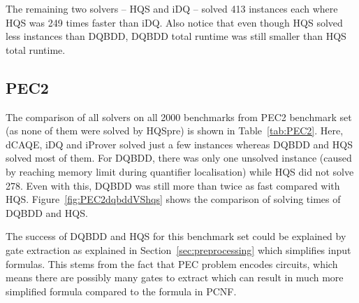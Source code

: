 \documentclass[
  digital, %
  color,
  twoside, %
  table,   %
  nolof,     %
  nolot,     %
]{fithesis3}
\theoremstyle{definition}
\theoremstyle{remark}
\begin{document}
The remaining two solvers -- HQS and iDQ -- solved 413 instances each where HQS was 249 times faster than iDQ. Also notice that even though HQS solved less instances than DQBDD, DQBDD total runtime was still smaller than HQS total runtime.

\subsection{PEC2}
The comparison of all solvers on all 2000 benchmarks from PEC2 benchmark set (as none of them were solved by HQSpre) is shown in Table~\ref{tab:PEC2}. Here, dCAQE, iDQ and iProver solved just a few instances whereas DQBDD and HQS solved most of them. For DQBDD, there was only one unsolved instance (caused by reaching memory limit during quantifier localisation) while HQS did not solve 278. Even with this, DQBDD was still more than twice as fast compared with HQS. Figure~\ref{fig:PEC2dqbddVShqs} shows the comparison of solving times of DQBDD and HQS.

The success of DQBDD and HQS for this benchmark set could be explained by gate extraction as explained in Section~\ref{sec:preprocessing} which simplifies input formulas. This stems from the fact that PEC problem encodes circuits, which means there are possibly many gates to extract which can result in much more simplified formula compared to the formula in PCNF.
\end{document}
